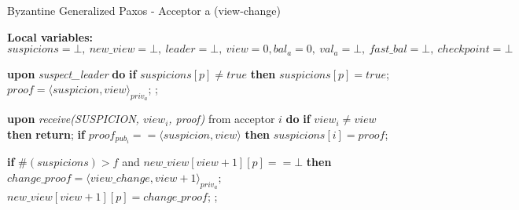 \begin{algorithm} 
	\caption{Byzantine Generalized Paxos - Acceptor a (view-change)}
	\label{BFT-Proc}
	\textbf{Local variables:} $suspicions = \bot,\ new\_view = \bot,\ leader = \bot,\ view = 0, bal_a = 0,\ val_a = \bot,\ fast\_bal = \bot,\ checkpoint=\bot$
	\begin{algorithmic}[1]		
		\State \textbf{upon} \textit{suspect\_leader} \textbf{do} 
		\State\hspace{\algorithmicindent} \textbf{if} $suspicions[p] \neq true$ \textbf{then}
		\State\hspace{\algorithmicindent}\hspace{\algorithmicindent} $suspicions[p] = true$;
		\State\hspace{\algorithmicindent}\hspace{\algorithmicindent} $proof = \langle suspicion, view \rangle_{priv_a}$;
		\State \hspace{\algorithmicindent}\hspace{\algorithmicindent} ;	
		\State
		
		\State \textbf{upon} \textit{receive(SUSPICION, $view_i$, proof)} from acceptor $i$ \textbf{do} 
		\State\hspace{\algorithmicindent} \textbf{if} $view_i \neq view$ \textbf{then}
		\State\hspace{\algorithmicindent}\hspace{\algorithmicindent} \textbf{return};
		\State\hspace{\algorithmicindent} \textbf{if} $proof_{pub_i} == \langle suspicion, view \rangle$ \textbf{then}
		\State\hspace{\algorithmicindent}\hspace{\algorithmicindent} $suspicions[i] = proof$;
		
		\State\hspace{\algorithmicindent} \textbf{if} $\#(suspicions) > f$ and $new\_view[view+1][p] == \bot$ \textbf{then}
		\State\hspace{\algorithmicindent}\hspace{\algorithmicindent} $change\_proof = \langle view\_change, view +1 \rangle_{priv_a}$;
		\State\hspace{\algorithmicindent}\hspace{\algorithmicindent} $new\_view[view+1][p] = change\_proof$;
		\State\hspace{\algorithmicindent}\hspace{\algorithmicindent} ;
		\State
		

\end{algorithmic}
\end{algorithm}
